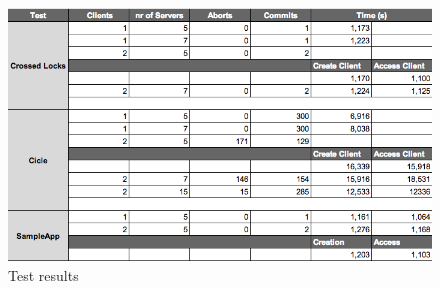 \documentclass[times, 10pt,twocolumn]{article}
\begin{document}
\begin{figure}[h!]
	\centering
	\includegraphics[scale=0.4]{Tabela.png}
	\caption{Test results}
\end{figure}
\end{document}
